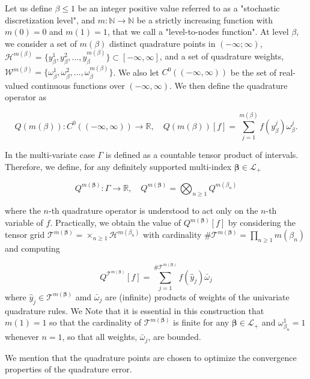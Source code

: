 \documentclass[11pt]{article}
\newcommand{\rset}{\mathbb{R}}
\newcommand{\nset}{\mathbb{N}}
\begin{document}
Let us define $\beta \le 1$ be an integer positive value referred to as a "stochastic discretization level", and $m: \nset \rightarrow \nset$ be a strictly increasing function with $m(0)=0$ and $m(1)=1$, that we call a "level-to-nodes function". At level $\beta$, we consider a set of $m(\beta)$ distinct quadrature points in $(-\infty; \infty)$, $\mathcal{H}^{m(\beta)}=\{y^1_\beta,y^2_\beta,\dots,y_\beta^{m(\beta)}\} \subset [-\infty,\infty]$, and a set of quadrature weights, $\mathcal{W}^{m(\beta)}=\{\omega^1_\beta,\omega^2_\beta,\dots,\omega_\beta^{m(\beta)}\}$. We also let $C^0((-\infty,\infty))$ be the set of real-valued continuous functions over $(-\infty, \infty)$. We then define the quadrature operator as


\begin{equation}
Q(m(\beta)):C^0((-\infty,\infty)) \rightarrow \rset, \quad Q(m(\beta))[f]= \sum_{j=1}^{m(\beta)} f(y^j_\beta) \omega_\beta^j.
\end{equation}






In the multi-variate case $\Gamma$ is defined as a countable tensor
product of intervals. Therefore,  we define, for any definitely supported multi-index $\boldsymbol{\beta} \in \mathcal{L}_+$

$$Q^{m(\boldsymbol{\beta})}: \Gamma \rightarrow \rset,\quad  Q^{m(\boldsymbol{\beta})}= \bigotimes_{n \ge 1} Q^{m(\beta_n)} $$

where the $n$-th quadrature operator is understood to act only on the $n$-th variable of $f$. Practically, we obtain the value of $Q^{m(\boldsymbol{\beta})}[f]$  by considering the tensor grid $\mathcal{T}^{m(\boldsymbol{\beta})}= \times_{n \ge 1} \mathcal{H}^{m(\beta_n)}$ with cardinality $\#\mathcal{T}^{m(\boldsymbol{\beta})}=\prod_{n \ge 1} m (\beta_n)$ and computing

$$ Q^{\mathcal{T}^{m(\boldsymbol{\beta})}}[f]= \sum_{j=1}^{\#\mathcal{T}^{m(\boldsymbol{\beta})}} f(\hat{y}_j) \bar{\omega}_j$$
where $\hat{y}_j \in \mathcal{T}^{m(\boldsymbol{\beta})}$ amd $\bar{\omega}_j$ are (infinite) products of weights of the univariate quadrature rules. We Note that it is essential in this construction that $m(1)=1$ so that the cardinality of $\mathcal{T}^{m(\boldsymbol{\beta})}$ is finite for any $\boldsymbol{\beta} \in \mathcal{L}_+$ and $ \omega_{\beta_n}^1=1$ whenever $n = 1$, so that all weights, $\bar{\omega}_j$, are bounded.

We mention that the quadrature points are chosen to optimize the convergence properties of the quadrature error.  
\end{document}
